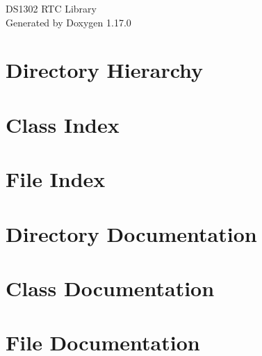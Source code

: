 \documentclass[twoside]{book}
\newcommand{\+}{\discretionary{\mbox{\scriptsize$\hookleftarrow$}}{}{}}
\newcommand{\clearemptydoublepage}{%
    \newpage{\pagestyle{empty}\cleardoublepage}%
  }
\begin{document}
  \raggedbottom
    \hypersetup{pageanchor=false,
                bookmarksnumbered=true,
                pdfencoding=unicode
               }
  \begin{titlepage}
  \vspace*{7cm}
  \begin{center}%
  {\Large DS1302 RTC Library}\\
  \vspace*{1cm}
  {\large Generated by Doxygen 1.17.0}\\
  \end{center}
  \end{titlepage}
  \clearemptydoublepage
  \tableofcontents
  \clearemptydoublepage
  \hypersetup{pageanchor=true}

\chapter{Directory Hierarchy}

\chapter{Class Index}

\chapter{File Index}

\chapter{Directory Documentation}


\chapter{Class Documentation}



\chapter{File Documentation}




  \backmatter
  \newpage
  \clearemptydoublepage
  \printindex
\end{document}
